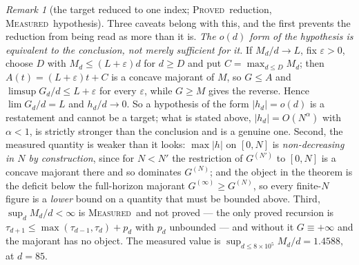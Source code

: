 \documentclass[11pt]{article}
\theoremstyle{definition}
\theoremstyle{remark}
\newtheorem{remark}[theorem]{Remark}
\newcommand{\PROVED}{\textsc{Proved}}
\newcommand{\MEASURED}{\textsc{Measured}}
\begin{document}
\begin{remark}[the target reduced to one index; \PROVED\ reduction, \MEASURED\ hypothesis]
Three caveats belong with this, and the first prevents the reduction from being read as more than it
is. \emph{The $o(d)$ form of the hypothesis is equivalent to the conclusion, not merely sufficient for
it.} If $M_d/d\to L$, fix $\varepsilon>0$, choose $D$ with $M_d\le(L+\varepsilon)d$ for $d\ge D$ and put
$C=\max_{d\le D}M_d$; then $A(t)=(L+\varepsilon)t+C$ is a concave majorant of $M$, so $G\le A$ and
$\limsup G_d/d\le L+\varepsilon$ for every $\varepsilon$, while $G\ge M$ gives the reverse. Hence
$\lim G_d/d=L$ and $h_d/d\to0$. So a hypothesis of the form $|h_d|=o(d)$ is a restatement and cannot be
a target; what is stated above, $|h_d|=O(N^{\alpha})$ with $\alpha<1$, is strictly stronger than the
conclusion and is a genuine one. Second, the measured quantity is weaker than it looks: $\max|h|$ on
$[0,N]$ is \emph{non-decreasing in $N$ by construction}, since for $N<N'$ the restriction of $G^{(N')}$
to $[0,N]$ is a concave majorant there and so dominates $G^{(N)}$; and the object in the theorem is the
deficit below the full-horizon majorant $G^{(\infty)}\ge G^{(N)}$, so every finite-$N$ figure is a
\emph{lower} bound on a quantity that must be bounded above. Third, $\sup_dM_d/d<\infty$ is
\MEASURED\ and not proved --- the only proved recursion is
$\tau_{d+1}\le\max(\tau_{d-1},\tau_d)+p_d$ with $p_d$ unbounded --- and without it $G\equiv+\infty$ and
the majorant has no object. The measured value is $\sup_{d\le8\times10^{5}}M_d/d=1.4588$, at $d=85$.
\end{remark}
\end{document}
